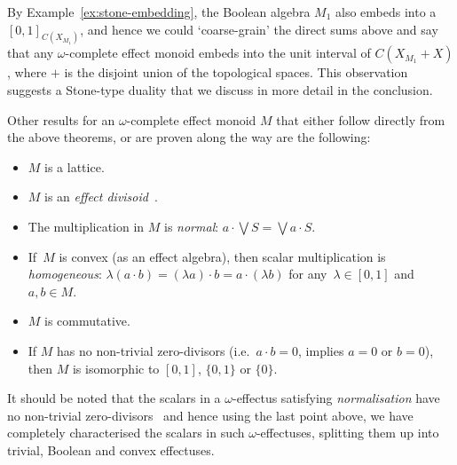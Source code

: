 \documentclass[10pt,conference]{IEEEtran}
\theoremstyle{definition}
\begin{document}
By Example~\ref{ex:stone-embedding}, the Boolean algebra $M_1$ also embeds into a $[0,1]_{C(X_{M_1})}$, and hence we could `coarse-grain' the direct sums above and say that any $\omega$-complete effect monoid embeds into the unit interval of $C(X_{M_1} + X)$, where $+$ is the disjoint union of the topological spaces. 
This observation suggests a Stone-type duality that we discuss in more detail in the conclusion.

Other results for an $\omega$-complete effect monoid $M$ that either follow directly from the above theorems, or are proven 
along the way are the following:
\begin{itemize}
	\item $M$ is a lattice.
	\item $M$ is an \emph{effect divisoid}~\cite{basthesis}.
	\item The multiplication in $M$ is \emph{normal}: $a\cdot \bigvee S = \bigvee a\cdot S$.
	\item If~$M$ is convex (as an effect algebra),
            then scalar multiplication is \emph{homogeneous}:
        $\lambda (a \cdot b) = (\lambda a) \cdot b = a \cdot(\lambda b)$
            for any~$\lambda \in [0,1]$ and~$a,b \in M$.
    \item $M$ is commutative.
    \item If $M$ has no non-trivial zero-divisors (i.e.~$a\cdot b = 0$, 
    implies $a=0$ or $b=0$), then $M$ is isomorphic to $[0,1]$, $\{0,1\}$ or $\{0\}$.
\end{itemize}

It should be noted that the scalars in a $\omega$-effectus satisfying \emph{normalisation} have no non-trivial zero-divisors~\cite{kentathesis} and hence using the last point above, we have completely characterised the scalars in such $\omega$-effectuses, splitting them up into trivial, Boolean and convex effectuses.
\end{document}
